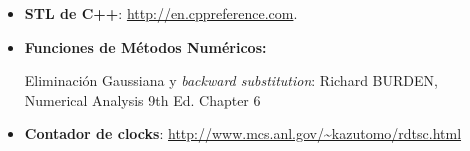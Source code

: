 \begin{itemize}
	\item \textbf{STL de C++}: \url{http://en.cppreference.com}.
	\item \textbf{Funciones de Métodos Numéricos:}
		\par Eliminación Gaussiana y \textit{backward substitution}: Richard BURDEN, Numerical Analysis 9th Ed. Chapter 6
	\item \textbf{Contador de clocks}: \url{http://www.mcs.anl.gov/\~kazutomo/rdtsc.html}
\end{itemize}



